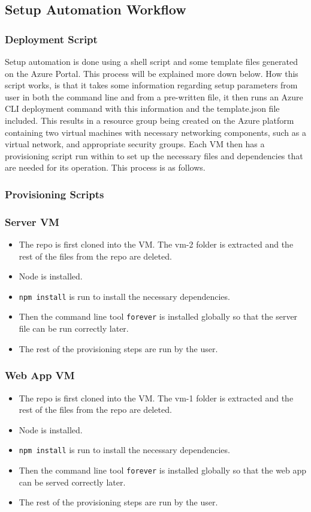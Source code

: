 \documentclass[12pt]{extarticle}
\begin{document}
\subsection{Setup Automation Workflow}
\subsubsection*{Deployment Script}
Setup automation is done using a shell script and some template files generated on the Azure Portal. This process will be explained more down below. How this script works, is that it takes some information regarding setup parameters from user in both the command line and from a pre-written file, it then runs an Azure CLI deployment command with this information and the template.json file included. This results in a resource group being created on the Azure platform containing two virtual machines with necessary networking components, such as a virtual network, and appropriate security groups. Each VM then has a provisioning script run within to set up the necessary files and dependencies that are needed for its operation. This process is as follows.
\subsubsection*{Provisioning Scripts}
\subsubsection*{Server VM}
\begin{itemize}
\item The repo is first cloned into the VM. The vm-2 folder is extracted and the rest of the files from the repo are deleted.
\item Node is installed.
\item \lstinline|npm install| is run to install the necessary dependencies.
\item Then the command line tool \lstinline|forever| is installed globally so that the server file can be run correctly later.
\item The rest of the provisioning steps are run by the user.
\end{itemize}

\subsubsection*{Web App VM}
\begin{itemize}
\item The repo is first cloned into the VM. The vm-1 folder is extracted and the rest of the files from the repo are deleted.
\item Node is installed.
\item \lstinline|npm install| is run to install the necessary dependencies.
\item Then the command line tool \lstinline|forever| is installed globally so that the web app can be served correctly later.
\item The rest of the provisioning steps are run by the user.
\end{itemize}
\end{document}
